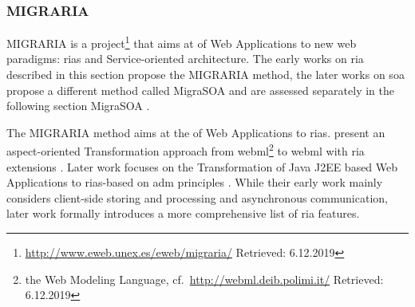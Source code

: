 \hypertarget{migraria}{%
\subsubsection*{MIGRARIA}\label{migraria}}

MIGRARIA \autocite{Sosa2014MigraSOA,Sosa2013MigraSOA,Rodriguez-Echeverria2012MIGRARIA,Rodriguez-Echeverria2010MIGRARIA} is a project\footnote{\url{http://www.eweb.unex.es/eweb/migraria/} Retrieved: 6.12.2019} that aims at  of  \glspl{Web Application} to new \gls{web} paradigms: \glspl{ria} and Service-oriented architecture.
The early works on \gls{ria} \autocite{Rodriguez-Echeverria2012MIGRARIA,Rodriguez-Echeverria2010MIGRARIA} described in this section propose the MIGRARIA method, the later works on \gls{soa} propose a different method called MigraSOA and are assessed separately in the following section MigraSOA \autocite{Sosa2014MigraSOA,Sosa2013MigraSOA}.

The MIGRARIA method aims at the  of  \glspl{Web Application} to \glspl{ria}.
\citet{Rodriguez-Echeverria2010MIGRARIA} present an aspect-oriented \gls{Transformation} approach from \gls{webml}\footnote{the Web Modeling Language, cf.~\url{http://webml.deib.polimi.it/} Retrieved: 6.12.2019} to \gls{webml} with \gls{ria} extensions \autocite{Bozzon2006WebMLforRIA,Manolescu2005,Carughi2009}.
Later work focuses on the \gls{Transformation} of Java J2EE based \glspl{Web Application} to \glspl{ria}-based on \gls{adm} principles \autocite{Rodriguez-Echeverria2012MIGRARIA}.
While their early work \autocite{Rodriguez-Echeverria2010MIGRARIA} mainly considers client-side storing and processing and asynchronous communication, later work \autocite{Rodriguez-Echeverria2012MIGRARIA} formally introduces a more comprehensive list of \gls{ria} features.

